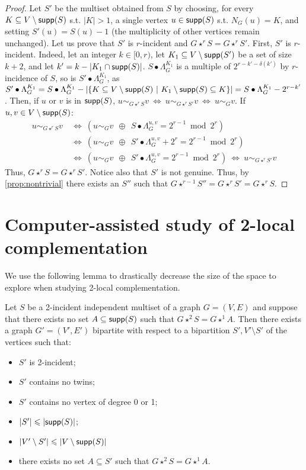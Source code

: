 \documentclass[a4paper,UKenglish,cleveref,autoref,thm-restate]{arxiv}
\newcommand{\se}{\subseteq}
\newcommand{\ls}{\leqslant}
\newcommand{\sm}{\setminus}
\newcommand{\supp}{\textup{\textsf{supp}}}
\begin{document}
\begin{proof}
    Let $S'$ be the multiset obtained from $S$ by choosing, for every $K \se V \sm \supp(S)$ s.t. $|K|>1$, a single vertex $u \in \supp(S)$ s.t. $N_{G}(u)=K$, and setting $S'(u)=S(u)-1$ (the multiplicity of other vertices remain unchanged). Let us prove that $S'$ is $r$-incident and $G \star^r S = G\star^{r} S'$. First, $S'$ is $r$-incident. Indeed, let an integer $k\in [0,r)$, let $K_1\subseteq V\setminus \supp(S')$ be a set of size $k+2$, and let $k'=k-|K_1\cap \supp(S)|$. $S\bullet \Lambda_G^{K_1}$ is a multiple of $2^{r-k'-\delta(k')}$ by $r$-incidence of $S$, so is $S'\bullet \Lambda_G^{K_1}$, as $S'\bullet \Lambda_G^{K_1} = S\bullet \Lambda_G^{K_1} -|\{K \se V \sm \supp(S)~|~K_1\sm \supp(S)\se K\}| = S\bullet \Lambda_G^{K_1} -2^{r-k'}$. Then, if $u$ or $v$ is in $\supp(S)$, $u\sim_{G\star^r S} v ~\Leftrightarrow~ u\sim_{G\star^{r} S'} v ~\Leftrightarrow~ u\sim_{G} v$. If $u,v \in V \sm \supp(S)$:
    \begin{align*}
        u\sim_{G\star^r S} v &~\Leftrightarrow~\left(u\sim_{G} v ~~\oplus~~ S \bullet\Lambda_G^{u,v} = 2^{r-1}\bmod 2^{r}\right)\\
        &~\Leftrightarrow~\left(u\sim_{G} v ~~\oplus~~ S'\bullet \Lambda_G^{u,v} +2^{r} = 2^{r-1}\bmod 2^{r}\right)\\
        &~\Leftrightarrow~\left(u\sim_{G} v ~~\oplus~~ S'\bullet \Lambda_G^{u,v} = 2^{r-1}\bmod 2^{r}\right)
        ~\Leftrightarrow~ u\sim_{G\star^{r}S'} v
    \end{align*}
    Thus, $G\star^r S = G\star^r S'$. Notice also that $S'$ is not genuine. Thus, by \cref{prop:nontrivial} there exists an $S''$ such that $G\star^{r-1} S'' = G \star^r S' = G \star^r S$.
\end{proof}

\section{Computer-assisted study of 2-local complementation}
\label{app:computer}

We use the following lemma to drastically decrease the size of the space to explore when studying 2-local complementation.

\begin{lemma} \label{lemma:lifting}
    Let $S$ be a 2-incident independent multiset of a graph $G=(V,E)$ and suppose that there exists no set $A \se \supp(S)$ such that $G \star^2 S = G \star^1 A$. Then there exists a graph $G'=(V',E')$ bipartite with respect to a bipartition $S', V' \sm S'$ of the vertices such that:
    \begin{itemize}
        \item $S'$ is 2-incident;
        \item $S'$ contains no twins;
        \item $S'$ contains no vertex of degree 0 or 1;
        \item $|S'| \ls |\supp(S)|$;
        \item $|V' \sm S'|\ls |V \sm \supp(S)|$ 
        \item there exists no set $A \se S'$ such that $G \star^2 S = G \star^1 A$.
    \end{itemize}
\end{lemma}
\end{document}

